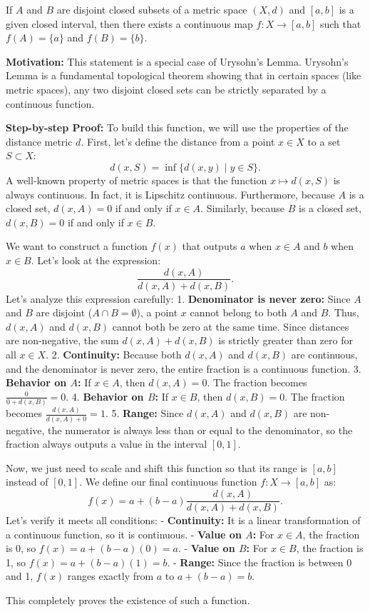 \begin{exercise}
\label{analysis:2025:5}
If $A$ and $B$ are disjoint closed subsets of a metric space $(X,d)$ and $[a,b]$ is a given closed interval, then there exists a continuous map $f:X\to[a,b]$ such that $f(A)=\{a\}$ and $f(B)=\{b\}$.
\end{exercise}

\begin{solution}
\textbf{Motivation:} This statement is a special case of Urysohn's Lemma. Urysohn's Lemma is a fundamental topological theorem showing that in certain spaces (like metric spaces), any two disjoint closed sets can be strictly separated by a continuous function.

\textbf{Step-by-step Proof:}
To build this function, we will use the properties of the distance metric $d$.
First, let's define the distance from a point $x \in X$ to a set $S \subset X$:
\[
d(x, S) = \inf \{ d(x, y) \mid y \in S \}.
\]
A well-known property of metric spaces is that the function $x \mapsto d(x, S)$ is always continuous. In fact, it is Lipschitz continuous.
Furthermore, because $A$ is a closed set, $d(x, A) = 0$ if and only if $x \in A$.
Similarly, because $B$ is a closed set, $d(x, B) = 0$ if and only if $x \in B$.

We want to construct a function $f(x)$ that outputs $a$ when $x \in A$ and $b$ when $x \in B$.
Let's look at the expression:
\[
\frac{d(x, A)}{d(x, A) + d(x, B)}.
\]
Let's analyze this expression carefully:
1. \textbf{Denominator is never zero:} Since $A$ and $B$ are disjoint ($A \cap B = \emptyset$), a point $x$ cannot belong to both $A$ and $B$. Thus, $d(x, A)$ and $d(x, B)$ cannot both be zero at the same time. Since distances are non-negative, the sum $d(x, A) + d(x, B)$ is strictly greater than zero for all $x \in X$.
2. \textbf{Continuity:} Because both $d(x, A)$ and $d(x, B)$ are continuous, and the denominator is never zero, the entire fraction is a continuous function.
3. \textbf{Behavior on $A$:} If $x \in A$, then $d(x, A) = 0$. The fraction becomes $\frac{0}{0 + d(x, B)} = 0$.
4. \textbf{Behavior on $B$:} If $x \in B$, then $d(x, B) = 0$. The fraction becomes $\frac{d(x, A)}{d(x, A) + 0} = 1$.
5. \textbf{Range:} Since $d(x, A)$ and $d(x, B)$ are non-negative, the numerator is always less than or equal to the denominator, so the fraction always outputs a value in the interval $[0, 1]$.

Now, we just need to scale and shift this function so that its range is $[a, b]$ instead of $[0, 1]$.
We define our final continuous function $f: X \to [a, b]$ as:
\[
f(x) = a + (b - a) \frac{d(x, A)}{d(x, A) + d(x, B)}.
\]
Let's verify it meets all conditions:
- \textbf{Continuity:} It is a linear transformation of a continuous function, so it is continuous.
- \textbf{Value on $A$:} For $x \in A$, the fraction is 0, so $f(x) = a + (b-a)(0) = a$.
- \textbf{Value on $B$:} For $x \in B$, the fraction is 1, so $f(x) = a + (b-a)(1) = b$.
- \textbf{Range:} Since the fraction is between 0 and 1, $f(x)$ ranges exactly from $a$ to $a + (b-a) = b$.

This completely proves the existence of such a function.
\end{solution}

